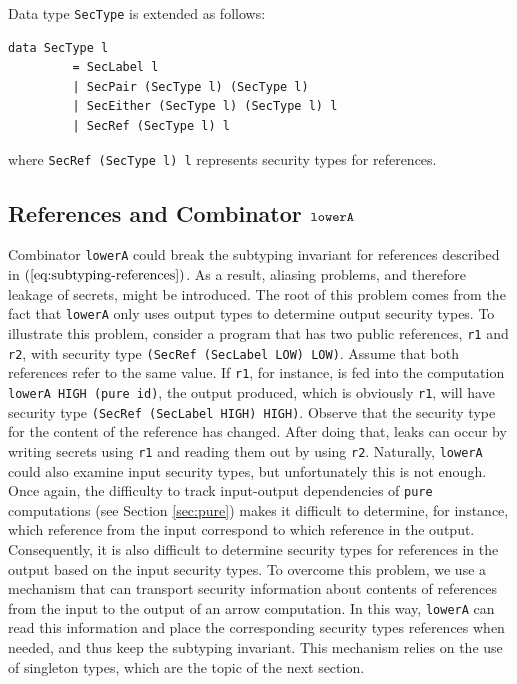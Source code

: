 \documentclass[times, 10pt,twocolumn]{article}
\begin{document}
Data type \texttt{SecType} is extended as follows:
\begin{Verbatim}[fontsize=\footnotesize]
data SecType l 
         = SecLabel l
         | SecPair (SecType l) (SecType l)
         | SecEither (SecType l) (SecType l) l
         | SecRef (SecType l) l
\end{Verbatim}
\noindent
where \texttt{SecRef (SecType l) l} represents security types for references.

\subsection{References and Combinator $\mathtt{lowerA}$}
\label{sec:refinlowerA}

Combinator \texttt{lowerA} could break the subtyping invariant for
references described in $(\ref{eq:subtyping-references})$. 
As a result, aliasing
problems, and therefore leakage of secrets, might be introduced.  
The root of this problem comes from the fact that
\texttt{lowerA} only uses output types  
to determine output security types. 
To illustrate this problem, consider a program 
that has two public references, \texttt{r1} and \texttt{r2},
with security type 
\texttt{(SecRef (SecLabel LOW) LOW)}. Assume that both references
refer to the same 
value. If \texttt{r1}, for instance, is fed into the computation 
\texttt{lowerA HIGH (pure id)}, the output produced, which is 
obviously \texttt{r1}, will have security type 
\texttt{(SecRef (SecLabel HIGH) HIGH)}. Observe that the security type 
for the content of the reference has changed. After doing that, leaks can 
occur by writing secrets using \texttt{r1} and reading them out by 
using \texttt{r2}. 
Naturally, \texttt{lowerA} could also examine input 
security types, but 
unfortunately this is not enough. Once again, the 
difficulty to track input-output dependencies of \texttt{pure}
computations (see Section \ref{sec:pure}) makes it difficult to determine, 
for instance,  which reference from the input correspond 
to which reference in the output. Consequently, it 
is also difficult to determine security types for references 
in the output based on the input security types. To overcome 
this problem, we use a mechanism that can
transport security information about contents of references from
the input to the output of an arrow computation. In this way, 
\texttt{lowerA} can read this information and place
the corresponding security types
references when needed, and thus keep the subtyping invariant.
This mechanism relies on the use of singleton
types, which are the topic of the next section.
\end{document}
